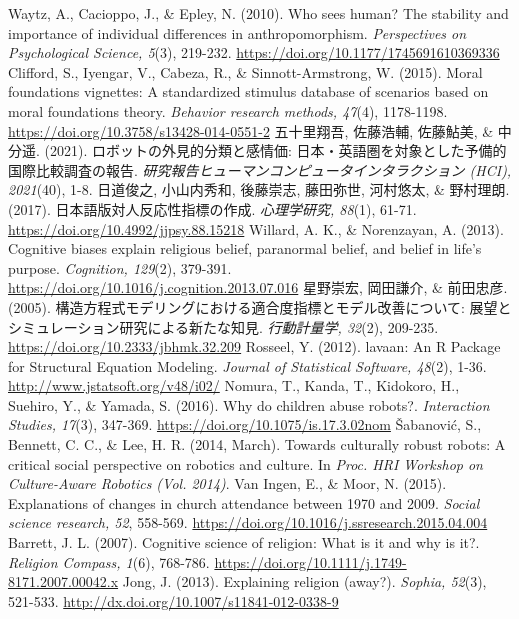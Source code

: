 \documentclass[a4j,12pt]{jreport}
\begin{document}
\begin{thebibliography}{999}
 Waytz, A., Cacioppo, J., \& Epley, N. (2010). Who sees human? The stability and importance of individual differences in anthropomorphism. \textsl{Perspectives on Psychological Science, 5}(3), 219-232. \url{https://doi.org/10.1177/1745691610369336}
 Clifford, S., Iyengar, V., Cabeza, R., \& Sinnott-Armstrong, W. (2015). Moral foundations vignettes: A standardized stimulus database of scenarios based on moral foundations theory. \textsl{Behavior research methods, 47}(4), 1178-1198. \url{https://doi.org/10.3758/s13428-014-0551-2}
 五十里翔吾, 佐藤浩輔, 佐藤鮎美, \& 中分遥. (2021). ロボットの外見的分類と感情価: 日本・英語圏を対象とした予備的国際比較調査の報告. \textsl{研究報告ヒューマンコンピュータインタラクション (HCI), 2021}(40), 1-8.
 日道俊之, 小山内秀和, 後藤崇志, 藤田弥世, 河村悠太, \& 野村理朗. (2017). 日本語版対人反応性指標の作成. \textsl{心理学研究, 88}(1), 61-71. \url{https://doi.org/10.4992/jjpsy.88.15218}
 Willard, A. K., \& Norenzayan, A. (2013). Cognitive biases explain religious belief, paranormal belief, and belief in life’s purpose. \textsl{Cognition, 129}(2), 379-391. \url{https://doi.org/10.1016/j.cognition.2013.07.016}
 星野崇宏, 岡田謙介, \& 前田忠彦. (2005). 構造方程式モデリングにおける適合度指標とモデル改善について: 展望とシミュレーション研究による新たな知見. \textsl{行動計量学, 32}(2), 209-235. \url{https://doi.org/10.2333/jbhmk.32.209}
 Rosseel, Y. (2012). lavaan: An R Package for Structural Equation Modeling. \textsl{Journal of Statistical Software, 48}(2), 1-36. \url{http://www.jstatsoft.org/v48/i02/}
 Nomura, T., Kanda, T., Kidokoro, H., Suehiro, Y., \& Yamada, S. (2016). Why do children abuse robots?. \textsl{Interaction Studies, 17}(3), 347-369. \url{https://doi.org/10.1075/is.17.3.02nom}
 \v{S}abanovi\'{c}, S., Bennett, C. C., \& Lee, H. R. (2014, March). Towards culturally robust robots: A critical social perspective on robotics and culture. In \textsl{Proc. HRI Workshop on Culture-Aware Robotics (Vol. 2014)}.
 Van Ingen, E., \& Moor, N. (2015). Explanations of changes in church attendance between 1970 and 2009. \textsl{Social science research, 52}, 558-569. \url{https://doi.org/10.1016/j.ssresearch.2015.04.004}
 Barrett, J. L. (2007). Cognitive science of religion: What is it and why is it?. \textsl{Religion Compass, 1}(6), 768-786. \url{https://doi.org/10.1111/j.1749-8171.2007.00042.x}
 Jong, J. (2013). Explaining religion (away?). \textsl{Sophia, 52}(3), 521-533. \url{http://dx.doi.org/10.1007/s11841-012-0338-9}

\end{thebibliography}
\end{document}
